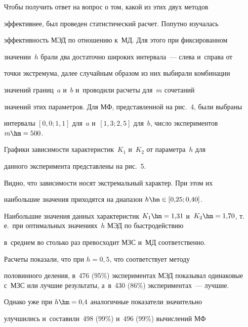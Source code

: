   


  Чтобы получить ответ на вопрос о том, какой из этих двух методов 


эффективнее, был проведен статистический расчет. Попутно изучалась 


эффективность МЭД по отношению к~МД. Для этого при фиксированном 


значении~$h$ брали два достаточно широких интервала~--- слева и~справа от 


точки экстремума, далее случайным образом из них выбирали комбинации 


значений границ~$a$ и~$b$ и~проводили расчеты для~$m$ сочетаний 


значений этих параметров.  Для МФ, представленной на рис.~4, были выбраны 


интервалы $[0{,}0; 1{,}1]$ для~$a$ и~$[1{,}3; 2{,}5]$ для~$b$, число экспериментов $m 


\hm= 500$. 


  


  Графики зависимости характеристик~$K_1$ и~$K_2$ от параметра~$h$ для 


данного эксперимента представлены на рис.~5.


 








 Видно, что зависимости носят экстремальный характер. При этом их 


наибольшие значения приходятся на диапазон $h\hm\in [0{,}25; 0{,}40]$. 


Наибольшие значения данных характеристик $K_1 \hm= 1{,}31$ и~$K_2 \hm= 


1{,}70$, т.\,е.\ при оптимальных значениях~$h$ МЭД по быстродействию 


в~среднем во столько раз превосходит МЗС и~МД соответственно.








  Расчеты показали, что при $h = 0{,}5$, что соответствует методу 


половинного деления, в~476 (95\%) экспериментах МЭД показывал одинаковые с~МЗС или лучшие результаты, а~в~430 (86\%) экспериментах~--- лучшие. 


Однако уже при $h\hm= 0{,}4$ аналогичные показатели значительно 


улучшились и~составили~498 (99\%) и~496 (99\%) вычислений МФ 


